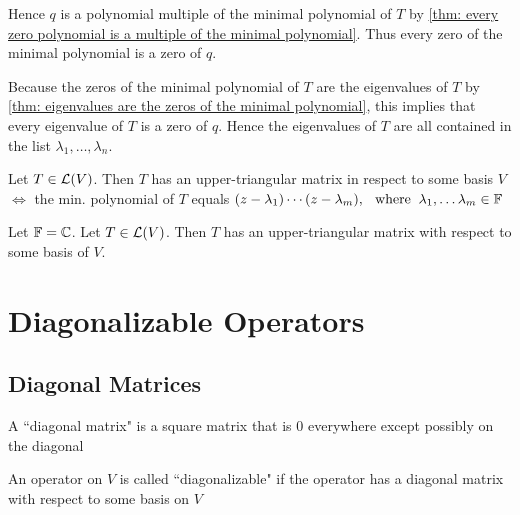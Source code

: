 \begin{prf}
  Hence $q$ is a polynomial multiple of the minimal polynomial of $T$ by \ref{thm: every zero polynomial is a multiple of the minimal polynomial}. Thus every zero of the minimal polynomial is a zero of $q$.
  
  Because the zeros of the minimal polynomial of $T$ are the eigenvalues of $T$ by \ref{thm: eigenvalues are the zeros of the minimal polynomial}, this implies that every eigenvalue of $T$ is a zero of $q$. Hence the eigenvalues of $T$ are all contained in the list $\lambda_1, \ldots, \lambda_n$.
\end{prf}


\setcounter{thm}{43}
\begin{thm}
  \label{thm:necessary and sufficient condition to have an upper-triangular-matrix}
  Let $T\in \mathcal{L}(V)$\footnotemark[1]. Then $T$ has an upper-triangular matrix in respect to some basis $V$ $\iff$ the min. polynomial of $T$ equals $(z-\lambda_1) \cdots (z-\lambda_m), \;\;\, \text{where}\;\; \lambda_1, \dots \lambda_m \in \mathbb{F}$
\end{thm}

\setcounter{thm}{46}
\begin{thm}
  \label{thm: necessary condition for every operator to have an upper-triangular matrix}
  Let $\mathbb{F} = \mathbb{C}$. Let $T\in \mathcal{L} (V)$\footnotemark[1]. Then $T$ has an upper-triangular matrix with respect to some basis of $V$.
\end{thm}

\setcounter{footnote}{1}

\pagebreak

\section{Diagonalizable Operators}
\subsection{Diagonal Matrices}

\setcounter{thm}{47}
\begin{mydef} 
  A ``diagonal matrix" is a square matrix that is $0$ everywhere except possibly on \nopagebreak the diagonal
\end{mydef}

\setcounter{thm}{49}
\begin{mydef} [diagonalizable]
  An operator on $V$ is called ``diagonalizable" if the operator has a diagonal matrix with respect to some basis on $V$
\end{mydef}

